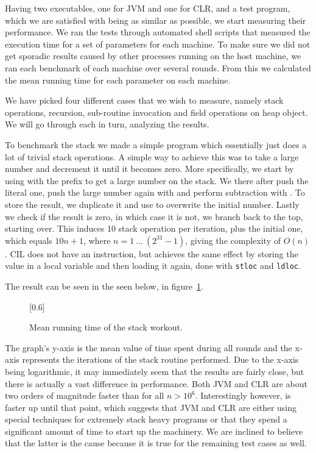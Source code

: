 Having two executables, one for JVM and one for CLR, and a \thename{} test
program, which we are satisfied with being as similar as possible, we start
measuring their performance. We ran the tests through automated shell scripts
that measured the execution time for a set of parameters for each machine. To
make sure we did not get sporadic results caused by other processes running on
the host machine, we ran each benchmark of each machine over several
rounds. From this we calculated the mean running time for each parameter on each
machine.

We have picked four different cases that we wish to measure, namely stack
operations, recursion, sub-routine invocation and field operations on heap
object. We will go through each in turn, analyzing the results.


To benchmark the stack we made a simple program which essentially just does a
lot of trivial stack operations. A simple way to achieve this was to take a
large number and decrement it until it becomes zero. More specifically, we start
by using  with the  prefix to get a large number
on the stack. We there after push the literal one, push the large number again
with  and perform subtraction with . To store the
result, we duplicate it and use  to overwrite the initial
number. Lastly we check if the result is zero, in which case it is not, we
branch back to the top, starting over. This induces 10 stack operation per
iteration, plus the initial one, which equals $10n + 1$, where
$n = 1\ ...\ (2^{31} -1)$, giving the complexity of $O(n)$. CIL does not have an
 instruction, but achieves the same effect by storing the
value in a local variable and then loading it again, done with {\tt stloc} and
{\tt ldloc}. %

The result can be seen in the seen below, in
figure~\ref{fig:eval:benchmark:stack}.
\begin{figure}[H]
  \centering
  \scalebox{0.8}[0.6]{}
  \caption{Mean running time of the stack workout.}
\label{fig:eval:benchmark:stack}
\end{figure}

The graph's y-axis is the mean value of time spent during all rounds and the
x-axis represents the iterations of the stack routine performed. Due to the
x-axis being logarithmic, it may immediately seem that the results are fairly
close, but there is actually a vast difference in performance. Both JVM and CLR
are about two orders of magnitude faster than \thename{} for all
$n>10^6$. Interestingly however, \thename{} is faster up until that point, which
suggests that JVM and CLR are either using special techniques for extremely
stack heavy programs or that they spend a significant amount of time to start up
the machinery. We are inclined to believe that the latter is the cause because
it is true for the remaining test cases as well.

